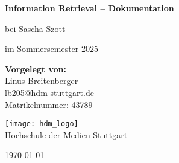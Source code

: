 \begin{titlepage}
    \begin{center}
        \vspace*{2cm}

        \Huge
        \textbf{Information Retrieval – Dokumentation}

        \vspace{0.5cm}
        \LARGE
        bei Sascha Szott

        \vspace{1.5cm}

        \Large
        im Sommersemester 2025

        \vspace{2cm}

        \textbf{Vorgelegt von:}\\[0.3cm]
        \normalsize
        Linus Breitenberger\\
        lb205@hdm-stuttgart.de\\
        Matrikelnummer: 43789

        \vfill

        \texttt{[image: hdm\_logo]}\\[0.5cm]
        Hochschule der Medien Stuttgart

        \vspace{0.8cm}
        \today

    \end{center}
\end{titlepage}

